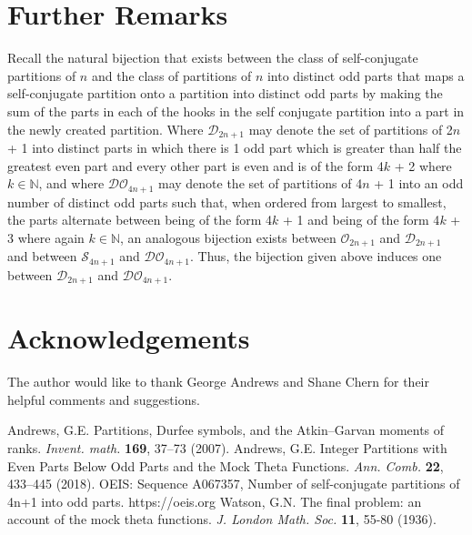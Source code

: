 \documentclass[11pt]{article}
\begin{document}
\section{Further Remarks}
Recall the natural bijection that exists between the class of self-conjugate partitions of $n$ and the class of partitions of $n$ into distinct odd parts that maps a self-conjugate partition onto a partition into distinct odd parts by making the sum of the parts in each of the hooks in the self conjugate partition into a part in the newly created partition. Where $\mathcal{D}_{2n+1}$ may denote the set of partitions of 2$n$ + 1 into distinct parts in which there is 1 odd part which is greater than half the greatest even part and every other part is even and is of the form 4$k$ + 2 where $k \in \mathbb{N}$, and where $\mathcal{DO}_{4n+1}$ may denote the set of partitions of 4$n$ + 1 into an odd number of distinct odd parts such that, when ordered from largest to smallest, the parts alternate between being of the form 4$k$ + 1 and being of the form 4$k$ + 3 where again $k \in \mathbb{N}$, an analogous bijection exists between $\mathcal{O}_{2n+1}$ and $\mathcal{D}_{2n+1}$ and between $\mathcal{S}_{4n+1}$ and $\mathcal{DO}_{4n+1}$. Thus, the bijection given above induces one between $\mathcal{D}_{2n+1}$ and $\mathcal{DO}_{4n+1}$.
\section*{Acknowledgements}
The author would like to thank George Andrews and Shane Chern for their helpful comments and suggestions.
\begin{thebibliography}{10}
 Andrews, G.E. Partitions, Durfee symbols, and the Atkin–Garvan moments of ranks. \textit{Invent. math.} \textbf{169}, 37–73 (2007). 
 Andrews, G.E. Integer Partitions with Even Parts Below Odd Parts and the Mock Theta Functions. \textit{Ann. Comb.} \textbf{22}, 433–445 (2018). 
OEIS: Sequence A067357, Number of self-conjugate partitions of 4n+1 into odd parts.
https://oeis.org
 Watson, G.N. The final problem: an account of the mock theta functions. \textit{J. London Math. Soc.} \textbf{11}, 55-80 (1936).
\end{thebibliography}
\end{document}
